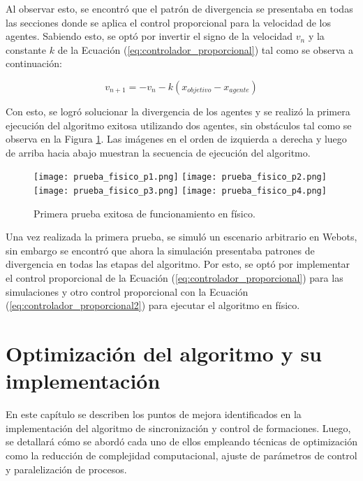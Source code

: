 Al observar esto, se encontró que el patrón de divergencia se presentaba en todas las secciones donde se aplica el control proporcional para la velocidad de los agentes. Sabiendo esto, se optó por invertir el signo de la velocidad $v_n$ y la constante $k$ de la Ecuación (\ref{eq:controlador_proporcional}) tal como se observa a continuación:

\begin{equation}
	v_{n+1} = -v_n - k(x_{objetivo} - x_{agente})
	\label{eq:controlador_proporcional2}
\end{equation}

Con esto, se logró solucionar la divergencia de los agentes y se realizó la primera ejecución del algoritmo exitosa utilizando dos agentes, sin obstáculos tal como se observa en la Figura \ref{fig:prueba_fisico1}. Las imágenes en el orden de izquierda a derecha y luego de arriba hacia abajo muestran la secuencia de ejecución del algoritmo.

\begin{figure}[H]
	\centering
	\texttt{[image: prueba\_fisico\_p1.png]}
	\texttt{[image: prueba\_fisico\_p2.png]}
	\texttt{[image: prueba\_fisico\_p3.png]}
	\texttt{[image: prueba\_fisico\_p4.png]}
	\caption{Primera prueba exitosa de funcionamiento en físico.}
	\label{fig:prueba_fisico1}
\end{figure}

Una vez realizada la primera prueba, se simuló un escenario arbitrario en Webots, sin embargo se encontró que ahora la simulación presentaba patrones de divergencia en todas las etapas del algoritmo. Por esto, se optó por implementar el control proporcional de la Ecuación (\ref{eq:controlador_proporcional}) para las simulaciones y otro control proporcional con la Ecuación (\ref{eq:controlador_proporcional2}) para ejecutar el algoritmo en físico.

\chapter{Optimización del algoritmo y su implementación}
En este capítulo se describen los puntos de mejora identificados en la implementación del algoritmo de sincronización y control de formaciones. Luego, se detallará cómo se abordó cada uno de ellos empleando técnicas de optimización como la reducción de complejidad computacional, ajuste de parámetros de control y paralelización de procesos.


